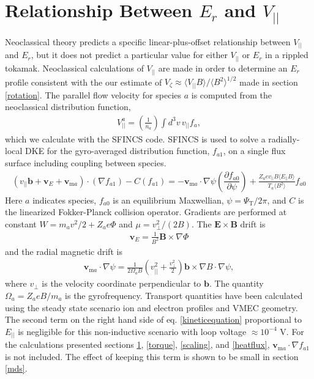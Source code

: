 \documentclass[aip, pop, preprint]{revtex4-1}
\numberwithin{figure}{section}
\numberwithin{equation}{section}
\newcommand{\partder}[2]{\dfrac{\partial  #1}{\partial  #2}} %
\begin{document}
\section{Relationship Between $E_r$ and $V_{||}$}\label{Erandv}
Neoclassical theory predicts a specific linear-plus-offset relationship between $V_{||}$ and $E_r$, but it does not predict a particular value for either $V_{||}$ or $E_r$ in a rippled tokamak. Neoclassical calculations of $V_{||}$ are made in order to determine an $E_r$ profile consistent with the our estimate of $V_{\zeta} \approx \langle V_{||} B \rangle/\langle B^2 \rangle^{1/2}$ made in section \ref{rotation}. The parallel flow velocity for species $a$ is computed from the neoclassical distribution function,
\begin{gather}
V^a_{||} = \left(\frac{1}{n_a}\right) \int d^3 v \, v_{||} f_a,
\label{eq:parallelflow}
\end{gather}
which we calculate with the SFINCS \cite{Landreman2014} code. SFINCS is used to solve a radially-local DKE for the gyro-averaged distribution function, $f_{a1}$, on a single flux surface including coupling between species. 
\begin{gather}
( v_{||} \bm{b} + \bm{v}_E + \bm{v}_{\text{m}a}) \cdot (\nabla f_{a1})  - C(f_{a1}) = - \bm{v}_{\text{m}a} \cdot \nabla \psi \left( \partder{f_{a0}}{\psi} \right) + \frac{Z_a e v_{||} B \langle E_{||} B \rangle}{T_a \langle B^2 \rangle } f_{a0}
\label{kineticequation}
\end{gather} 
\hspace{-1mm}
Here $a$ indicates species, $f_{a0}$ is an equilibrium Maxwellian, $\psi = \Psi_{\text{T}}/2\pi$, and $C$ is the linearized Fokker-Planck collision operator. Gradients are performed at constant $W = m_a v^2/2 + Z_a e \Phi$ and $\mu = v_{\perp}^2/(2B)$. The $\bm{E} \times \bm{B}$ drift is 
\begin{gather}
\bm{v}_E = \frac{1}{B^2} \bm{B} \times \nabla \Phi
\end{gather} 
and the radial magnetic drift is
\begin{gather}
\bm{v}_{\text{m}a} \cdot \nabla \psi = \frac{1}{2\Omega_a B} \left(v_{||}^2 + \frac{v_{\perp}^2}{2} \right) \bm{b} \times \nabla B \cdot \nabla \psi,
\label{magneticdrift}
\end{gather} 
where $v_{\perp}$ is the velocity coordinate perpendicular to $\bm{b}$. The quantity $\Omega_a = Z_aeB/m_a$ is the gyrofrequency. Transport quantities have been calculated using the steady state scenario ion and electron profiles and VMEC geometry. The second term on the right hand side of eq. \ref{kineticequation} proportional to $E_{||}$ is negligible for this non-inductive scenario with loop voltage $ \approx 10^{-4}$ V. For the calculations presented sections \ref{Erandv}, \ref{torque}, \ref{scaling}, and \ref{heatflux}, $\bm{v}_{\text{m}a} \cdot \nabla f_{a1}$ is not included. The effect of keeping this term is shown to be small in section \ref{mds}.
\end{document}

